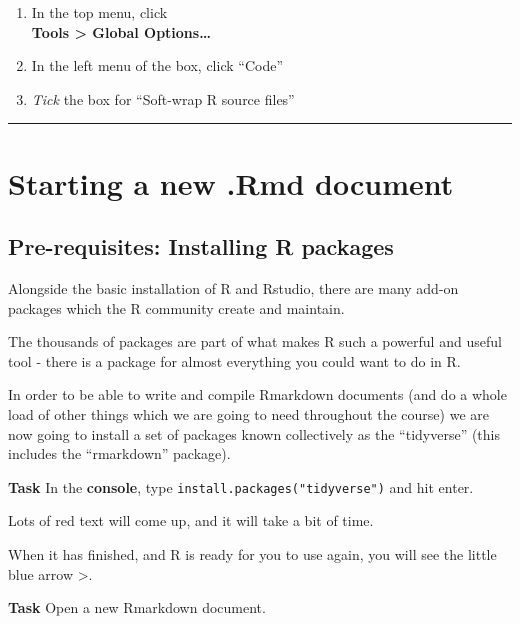 \documentclass[]{book}
\providecommand{\tightlist}{%
  \setlength{\itemsep}{0pt}\setlength{\parskip}{0pt}}
\begin{document}
\begin{enumerate}
\def\labelenumi{\arabic{enumi}.}
\tightlist
\item
  In the top menu, click\\
  \textbf{Tools \textgreater{} Global Options\ldots{}}
\item
  In the left menu of the box, click ``Code''
\item
  \emph{Tick} the box for ``Soft-wrap R source files''
\end{enumerate}

\begin{center}\rule{0.5\linewidth}{0.5pt}\end{center}

\hypertarget{starting-a-new-.rmd-document}{%
\section{Starting a new .Rmd document}\label{starting-a-new-.rmd-document}}

\hypertarget{pre-requisites-installing-r-packages}{%
\subsection*{Pre-requisites: Installing R packages}\label{pre-requisites-installing-r-packages}}

Alongside the basic installation of R and Rstudio, there are many add-on packages which the R community create and maintain.

The thousands of packages are part of what makes R such a powerful and useful tool - there is a package for almost everything you could want to do in R.

In order to be able to write and compile Rmarkdown documents (and do a whole load of other things which we are going to need throughout the course) we are now going to install a set of packages known collectively as the ``tidyverse'' (this includes the ``rmarkdown'' package).

\textbf{Task}
In the \textbf{console}, type \texttt{install.packages("tidyverse")} and hit enter.

Lots of red text will come up, and it will take a bit of time.

When it has finished, and R is ready for you to use again, you will see the little blue arrow {\textgreater{}}.

\textbf{Task}
Open a new Rmarkdown document.
\end{document}
